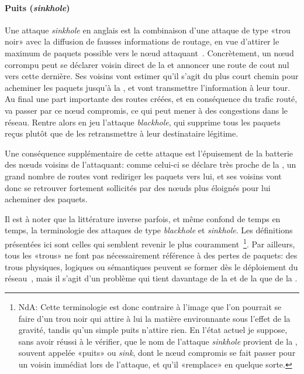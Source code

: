         \paragraph{Puits (\textit{sinkhole})}
Une attaque \textit{sinkhole} en anglais est la combinaison d'une attaque de type «trou noir» avec la diffusion de fausses informations de routage, en vue d'attirer le maximum de paquets possible vers le nœud attaquant~\cite{CT04}.
Concrètement, un nœud corrompu peut se déclarer voisin direct de la \sdb et annoncer une route de cout nul vers cette dernière.
Ses voisins vont estimer qu'il s'agit du plus court chemin pour acheminer les paquets jusqu'à la \sdb, et vont transmettre l'information à leur tour.
Au final une part importante des routes créées, et en conséquence du trafic routé, va passer par ce nœud compromis, ce qui peut mener à des congestions dans le réseau.
Rentre alors en jeu l'attaque \textit{blackhole}, qui supprime tous les paquets reçus plutôt que de les retransmettre à leur destinataire légitime.

Une conséquence supplémentaire de cette attaque est l'épuisement de la batterie des nœuds voisins de l'attaquant: comme celui-ci se déclare très proche de la \sdb, un grand nombre de routes vont rediriger les paquets vers lui, et ses voisins vont donc se retrouver fortement sollicités par des nœuds plus éloignés pour lui acheminer des paquets.

Il est à noter que la littérature inverse parfois, et même confond de temps en temps, la terminologie des attaques de type \textit{blackhole} et \textit{sinkhole}.
Les définitions présentées ici sont celles qui semblent revenir le plus couramment%
\,\footnote{%
    NdA: Cette terminologie est donc contraire à l'image que l'on pourrait se faire d'un trou noir qui attire à lui la matière environnante sous l'effet de la gravité, tandis qu'un simple puits n'attire rien.
    En l'état actuel je suppose, sans avoir réussi à le vérifier, que le nom de l'attaque \textit{sinkhole} provient de la \sdb, souvent appelée «puits» ou \textit{sink}, dont le nœud compromis se fait passer pour un voisin immédiat lors de l'attaque, et qu'il «remplace» en quelque sorte.%
}.
Par ailleurs, tous les «trous» ne font pas nécessairement référence à des pertes de paquets: des trous physiques, logiques ou sémantiques peuvent se former dès le déploiement du réseau~\cite{AKJ05,JSM13}, mais il s'agit d'un problème qui tient davantage de la  et de la \resilience que de la \secu.

